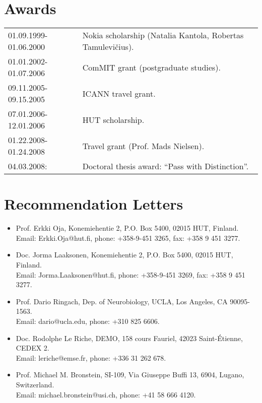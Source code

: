 \documentclass[a4paper,11pt]{article}
\begin{document}
\section{Awards}
%
\begin{tabularx}{\textwidth}{@{}p{3cm}X@{}}
        01.09.1999-01.06.2000 & Nokia scholarship (Natalia Kantola, Robertas Tamulevičius).\\
        01.01.2002-01.07.2006 & ComMIT grant (postgraduate studies).\\
        09.11.2005-09.15.2005 & ICANN travel grant.\\
        07.01.2006-12.01.2006 & HUT scholarship.\\
        01.22.2008-01.24.2008 & Travel grant (Prof. Mads Nielsen).\\
        04.03.2008: & Doctoral thesis award: “Pass with Distinction”.
\end{tabularx}
%
\section{Recommendation Letters}
%
\begin{itemize}
\item Prof. Erkki Oja, Konemiehentie 2, P.O. Box 5400, 02015 HUT, Finland. \\
Email: Erkki.Oja@hut.fi, phone: +358-9-451 3265, fax: +358 9 451 3277.
\item Doc. Jorma Laaksonen, Konemiehentie 2, P.O. Box 5400, 02015 HUT, Finland. \\
Email: Jorma.Laaksonen@hut.fi, phone: +358-9-451 3269, fax: +358 9 451 3277.
\item Prof. Dario Ringach, Dep. of Neurobiology, UCLA, Los Angeles, CA 90095-1563. \\
Email: dario@ucla.edu, phone: +310 825 6606.
\item Doc. Rodolphe Le Riche, DEMO, 158 cours Fauriel, 42023 Saint-Étienne, CEDEX 2.\\ 
Email: leriche@emse.fr, phone: +336 31 262 678.
\item Prof. Michael M. Bronstein, SI-109, Via Giuseppe Buffi 13, 6904, Lugano, Switzerland.\\
Email: michael.bronstein@usi.ch, phone: +41 58 666 4120.
\end{itemize}
%
\end{document}
